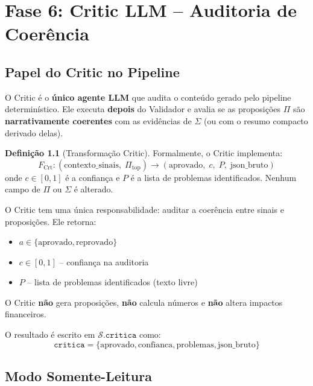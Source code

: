 \documentclass[a4paper, 12pt]{report}
\theoremstyle{definition}
\newtheorem{definicao}{Defini\c{c}\~ao}[chapter]
\theoremstyle{remark}
\newcommand{\state}{\mathcal{S}}
\begin{document}
\chapter{Fase 6: Critic LLM -- Auditoria de Coer\^encia}

\section{Papel do Critic no Pipeline}

O Critic \'e o \textbf{\'unico agente LLM} que audita o conte\'udo gerado
pelo pipeline determin\'istico. Ele executa \textbf{depois} do Validador
e avalia se as proposi\c{c}\~oes $\Pi$ s\~ao \textbf{narrativamente coerentes}
com as evid\^encias de $\Sigma$ (ou com o resumo compacto derivado delas).

\begin{definicao}[Transforma\c{c}\~ao Critic]
  Formalmente, o Critic implementa:
  \[
    F_{\text{Crt}} : (\text{contexto\_sinais},\; \Pi_{\text{top}}) \to
    (\text{aprovado},\; c,\; P,\; \text{json\_bruto})
  \]
  onde $c \in [0, 1]$ \'e a confian\c{c}a e $P$ \'e a lista de problemas
  identificados. Nenhum campo de $\Pi$ ou $\Sigma$ \'e alterado.
\end{definicao}

\begin{caixadecisao}
  O Critic tem uma \'unica responsabilidade: auditar a coer\^encia
  entre sinais e proposi\c{c}\~oes. Ele retorna:
  \begin{itemize}
    \item $a \in \{\text{aprovado}, \text{reprovado}\}$
    \item $c \in [0, 1]$ -- confian\c{c}a na auditoria
    \item $P$ -- lista de problemas identificados (texto livre)
  \end{itemize}
  O Critic \textbf{n\~ao} gera proposi\c{c}\~oes, \textbf{n\~ao} calcula
  n\'umeros e \textbf{n\~ao} altera impactos financeiros.
\end{caixadecisao}

O resultado \'e escrito em $\state.\texttt{critica}$ como:
\[
  \texttt{critica} = \{\text{aprovado}, \text{confianca}, \text{problemas},
  \text{json\_bruto}\}
\]


\section{Modo Somente-Leitura}
\end{document}

